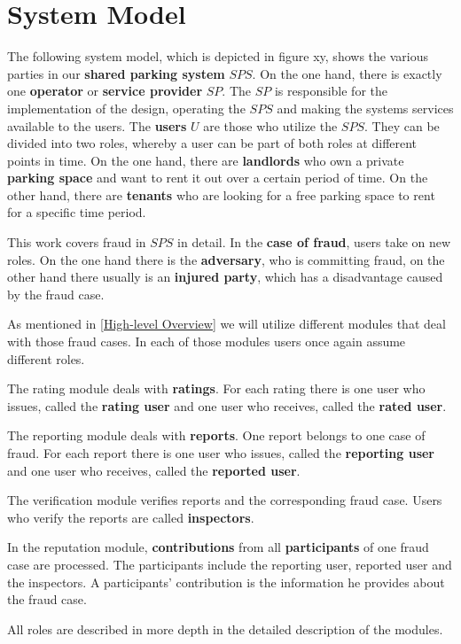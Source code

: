 \section{System Model}\label{System Model}
The following system model, which is depicted in figure xy, shows the various parties in our \textbf{shared parking system} $SPS$. On the one hand, there is exactly one \textbf{operator} or \textbf{service provider} $SP$. The $SP$ is responsible for the implementation of the design, operating the $SPS$ and making the systems services available to the users. The \textbf{users} $U$ are those who utilize the $SPS$. They can be divided into two roles, whereby a user can be part of both roles at different points in time. On the one hand, there are \textbf{landlords} who own a private \textbf{parking space} and want to rent it out over a certain period of time. On the other hand, there are \textbf{tenants} who are looking for a free parking space to rent for a specific time period.

This work covers fraud in $SPS$ in detail. In the \textbf{case of fraud}, users take on new roles. On the one hand there is the \textbf{adversary}, who is committing fraud, on the other hand there usually is an \textbf{injured party}, which has a disadvantage caused by the fraud case.

As mentioned in \ref{High-level Overview} we will utilize different modules that deal with those fraud cases. In each of those modules users once again assume different roles.

The rating module deals with \textbf{ratings}. For each rating there is one user who issues, called the\textbf{ rating user} and one user who receives, called the \textbf{rated user}.

The reporting module deals with \textbf{reports}. One report belongs to one case of fraud. For each report there is one user who issues, called the \textbf{reporting user} and one user who receives, called the \textbf{reported user}.

The verification module verifies reports and the corresponding fraud case. Users who verify the reports are called \textbf{inspectors}.

In the reputation module, \textbf{contributions} from all \textbf{participants} of one fraud case are processed. The participants include the reporting user, reported user and the inspectors. A participants' contribution is the information he provides about the fraud case.

All roles are described in more depth in the detailed description of the modules.\\

